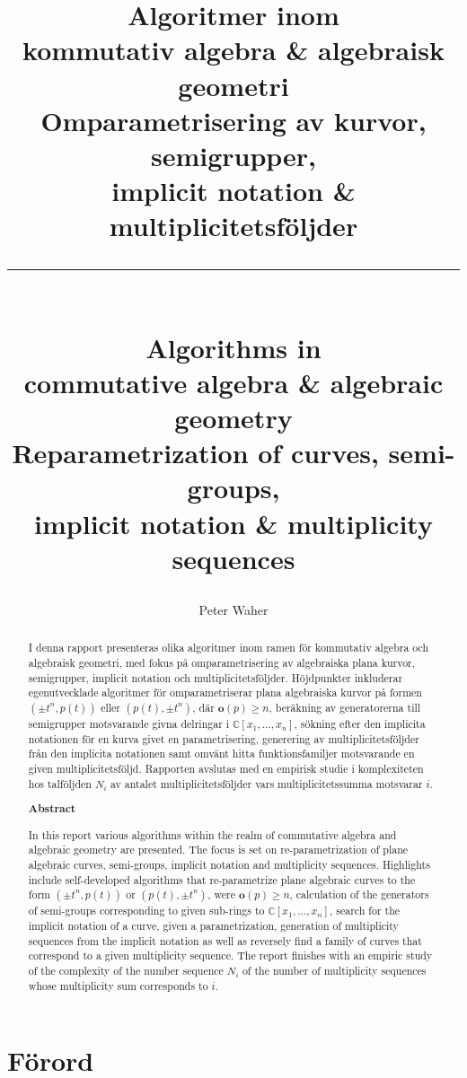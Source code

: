 \documentclass[twoside]{report}
\title{Algoritmer inom \\
	kommutativ algebra \& algebraisk geometri \\[20pt]
	\large Omparametrisering av kurvor, semigrupper, \\
	implicit notation \& multiplicitetsföljder\\[15pt]
	\hrule \\[15pt]
	\Large Algorithms in\\
	commutative algebra \& algebraic geometry \\[20pt]
	\large Reparametrization of curves, semi-groups, \\
	implicit notation \& multiplicity sequences\\[20pt]}
\author{Peter Waher}
\begin{document}
\maketitle

\begin{abstract}
I denna rapport presenteras olika algoritmer inom ramen för kommutativ algebra och algebraisk geometri, med fokus på omparametrisering av algebraiska plana kurvor, semigrupper, implicit notation och multiplicitetsföljder. Höjdpunkter inkluderar egenutvecklade algoritmer för omparametriserar plana algebraiska kurvor på formen $(\pm t^n, p(t))$ eller $(p(t), \pm t^n)$, där $\mathbf{o}(p)\geq n$, beräkning av generatorerna till semigrupper motsvarande givna delringar i $\mathbb{C}[x_1,\ldots,x_n]$, sökning efter den implicita notationen för en kurva givet en parametrisering, generering av multiplicitetsföljder från den implicita notationen samt omvänt hitta funktionsfamiljer motsvarande en given multiplicitetsföljd. Rapporten avslutas med en empirisk studie i komplexiteten hos talföljden $N_i$ av antalet multiplicitetsföljder vars multiplicitetssumma motsvarar $i$.

\begin{center}
	\textbf{Abstract}
\end{center}

In this report various algorithms within the realm of commutative algebra and algebraic geometry are presented. The focus is set on re-parametrization of plane algebraic curves, semi-groups, implicit notation and multiplicity sequences. Highlights include self-developed algorithms that re-parametrize plane algebraic curves to the form $(\pm t^n, p(t))$ or $(p(t), \pm t^n)$, were $\mathbf{o}(p)\geq n$, calculation of the generators of semi-groups corresponding to given sub-rings to $\mathbb{C}[x_1,\ldots,x_n]$, search for the implicit notation of a curve, given a parametrization, generation of multiplicity sequences from the implicit notation as well as reversely find a family of curves that correspond to a given multiplicity sequence. The report finishes with an empiric study of the complexity of the number sequence $N_i$ of the number of multiplicity sequences whose multiplicity sum corresponds to $i$.
\end{abstract}

\section*{Förord}
\end{document}
